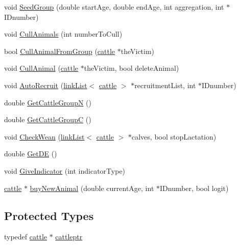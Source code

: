 \begin{DoxyCompactItemize}
\item 
void \hyperlink{classcattle_group_a0f7c6c00ebef0008d2206dde4b2430db}{SeedGroup} (double startAge, double endAge, int aggregation, int $\ast$IDnumber)
\item 
void \hyperlink{classcattle_group_aef414c795b55a4b9add2402bc6cf0aaa}{CullAnimals} (int numberToCull)
\item 
bool \hyperlink{classcattle_group_a29c365d2a7e0aa8fa2d2c09936306839}{CullAnimalFromGroup} (\hyperlink{classcattle}{cattle} $\ast$theVictim)
\item 
void \hyperlink{classcattle_group_aac8d50c5b32a65a1afd0ff10ea12503e}{CullAnimal} (\hyperlink{classcattle}{cattle} $\ast$theVictim, bool deleteAnimal)
\item 
void \hyperlink{classcattle_group_ab4dfc6412c67bd4c37cf793a611418bb}{AutoRecruit} (\hyperlink{classlink_list}{linkList}$<$ \hyperlink{classcattle}{cattle} $>$ $\ast$recruitmentList, int $\ast$IDnumber)
\item 
double \hyperlink{classcattle_group_a3c3c4ab462568c477f17a3842f828559}{GetCattleGroupN} ()
\item 
double \hyperlink{classcattle_group_ae47b260227ef5e23c24491c3958121d1}{GetCattleGroupC} ()
\item 
void \hyperlink{classcattle_group_a9ed58662cb74b50fb0cd4bc4ebd4864a}{CheckWean} (\hyperlink{classlink_list}{linkList}$<$ \hyperlink{classcattle}{cattle} $>$ $\ast$calves, bool stopLactation)
\item 
double \hyperlink{classcattle_group_a8ca2bba9c9b426014ad7ea7f87df06f3}{GetDE} ()
\item 
void \hyperlink{classcattle_group_a302e7ade98ec5f4c60c32f4123d14b09}{GiveIndicator} (int indicatorType)
\item 
\hyperlink{classcattle}{cattle} $\ast$ \hyperlink{classcattle_group_a441a8a788280bfd2330560fae7fd7079}{buyNewAnimal} (double currentAge, int $\ast$IDnumber, bool logit)
\end{DoxyCompactItemize}
\subsection*{Protected Types}
\begin{DoxyCompactItemize}
\item 
typedef \hyperlink{classcattle}{cattle} $\ast$ \hyperlink{classcattle_group_ab46f6051e0fca98c9771d4cefa0e8804}{cattleptr}
\end{DoxyCompactItemize}
